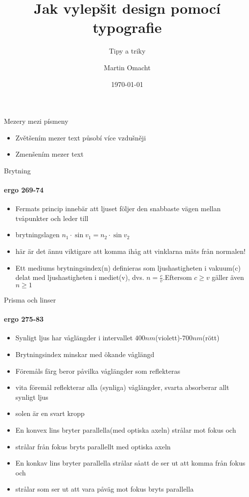 \documentclass{beamer}
\title{Jak vylepšit design pomocí typografie}
\subtitle{Tipy a triky}
\date{\today}
\author{Martin Omacht}
\begin{document}
\maketitle

\begin{frame}{Mezery mezi písmeny}    
	\begin{itemize}
		\item Zvětšením mezer text působí více vzdušněji
		\item Zmenšením mezer text 
	\end{itemize}    
\end{frame}





\begin{frame}{Brytning}
\framesubtitle{ergo 269-74}
\begin{itemize}
\item \alert{Fermats princip} inneb\"ar att ljuset f\"oljer den snabbaste v\"agen mellan tv\aa punkter och leder till
 \item \alert{brytningslagen} $n_1\cdot \sin v_1=n_2\cdot \sin v_2$
 \item h\"ar \"ar det \"annu viktigare att komma ih\aa g att vinklarna m\"ats fr\aa n normalen!
 \item Ett mediums \alert{brytningsindex(n)} definieras som ljushastigheten i vakuum(c) delat med ljushastigheten i mediet(v), dvs. $n=\frac{c}{v}$.Eftersom $c \geq v$ g\"aller \"aven $n \geq 1$ 
\end{itemize}
\end{frame}

 




\begin{frame}{Prisma och linser}
\framesubtitle{ergo 275-83}
   
  \begin{itemize}
    \item Synligt ljus har v\aa gl\"angder i intervallet $400 nm$(violett)-$700 nm$(r\"ott)
    \item Brytningsindex minskar med \"okande v\aa gl\"angd
    \item F\"orem\aa ls f\"arg beror p\aa vilka v\aa gl\"angder som reflekteras
    \item vita f\"orem\aa l reflekterar alla (synliga) v\aa gl\"angder, svarta absorberar allt synligt ljus
    \item solen \"ar en svart kropp
    \item En \alert{konvex lins} bryter parallella(med optiska axeln) str\aa lar mot fokus och
    \item str\aa lar fr\aa n fokus bryts parallellt med optiska axeln
    \item En \alert{konkav lins} bryter parallella str\aa lar s\aa att de ser ut att komma fr\aa n fokus och 
    \item str\aa lar som ser ut att vara p\aa v\"ag mot fokus bryts parallella
    
  \end{itemize}
  

\end{frame}
\end{document}
